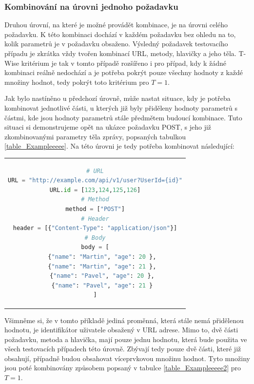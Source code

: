 \subsubsection*{Kombinování na úrovni jednoho požadavku}

Druhou úrovní, na které je možné provádět kombinace, je na úrovni celého požadavku. K této kombinaci dochází v každém požadavku bez ohledu na to, kolik parametrů je v požadavku obsaženo. Výsledný požadavek testovacího případu je zkrátka vždy tvořen kombinací URL, metody, hlavičky a jeho těla. T-Wise kritérium je tak v tomto případě rozšířeno i pro případ, kdy k žádné kombinaci reálně nedochází a je potřeba pokrýt pouze všechny hodnoty z každé množiny hodnot, tedy pokrýt toto kritérium pro $T=1$. 

Jak bylo nastíněno u předchozí úrovně, může nastat situace, kdy je potřeba kombinovat jednotlivé části, u kterých již byly přiděleny hodnoty parametrů s částmi, kde jsou hodnoty parametrů stále předmětem budoucí kombinace. Tuto situaci si demonstrujeme opět na ukázce požadavku POST, s jeho již zkombinovanými parametry těla zprávy, popsaných tabulkou \ref{table_Exampleeeee}. Na této úrovni je tedy potřeba kombinovat následující: 

\begin{center}
\begin{tabular}{c}
\begin{lstlisting}[language=Python]
# URL
URL = "http://example.com/api/v1/user?UserId={id}"
URL.id = [123,124,125,126]
# Method
method = ["POST"]
# Header
header = [{"Content-Type": "application/json"}]
# Body
body = [
	{"name": "Martin", "age": 20 },
	{"name": "Martin", "age": 21 },
	{"name": "Pavel", "age": 20 },
	{"name": "Pavel", "age": 21 }
]
\end{lstlisting}
\end{tabular}
\end{center}

Všimněme si, že v tomto příkladě jediná proměnná, která stále nemá přidělenou hodnotu, je identifikátor uživatele obsažený v URL adrese. Mimo to, dvě části požadavku, metoda a hlavička, mají pouze jednu hodnotu, která bude použita ve všech testovacích případech této úrovně. Zbývají tedy pouze dvě části, které již obsahují, případně budou obsahovat víceprvkovou množinu hodnot. Tyto množiny jsou poté kombinovány způsobem popsaný v tabulce \ref{table_Exampleeeee2} pro $T=1$. 

